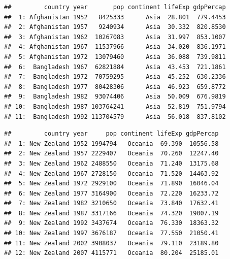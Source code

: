 \documentclass[]{article}
\newenvironment{Shaded}{\begin{snugshade}}{\end{snugshade}}
\newcommand{\KeywordTok}[1]{\textcolor[rgb]{0.13,0.29,0.53}{\textbf{{#1}}}}
\newcommand{\StringTok}[1]{\textcolor[rgb]{0.31,0.60,0.02}{{#1}}}
\newcommand{\CommentTok}[1]{\textcolor[rgb]{0.56,0.35,0.01}{\textit{{#1}}}}
\newcommand{\NormalTok}[1]{{#1}}
\begin{document}
\begin{verbatim}
##         country year       pop continent lifeExp gdpPercap
##  1: Afghanistan 1952   8425333      Asia  28.801  779.4453
##  2: Afghanistan 1957   9240934      Asia  30.332  820.8530
##  3: Afghanistan 1962  10267083      Asia  31.997  853.1007
##  4: Afghanistan 1967  11537966      Asia  34.020  836.1971
##  5: Afghanistan 1972  13079460      Asia  36.088  739.9811
##  6:  Bangladesh 1967  62821884      Asia  43.453  721.1861
##  7:  Bangladesh 1972  70759295      Asia  45.252  630.2336
##  8:  Bangladesh 1977  80428306      Asia  46.923  659.8772
##  9:  Bangladesh 1982  93074406      Asia  50.009  676.9819
## 10:  Bangladesh 1987 103764241      Asia  52.819  751.9794
## 11:  Bangladesh 1992 113704579      Asia  56.018  837.8102
\end{verbatim}

\begin{Shaded}
\end{Shaded}

\begin{verbatim}
##         country year     pop continent lifeExp gdpPercap
##  1: New Zealand 1952 1994794   Oceania  69.390  10556.58
##  2: New Zealand 1957 2229407   Oceania  70.260  12247.40
##  3: New Zealand 1962 2488550   Oceania  71.240  13175.68
##  4: New Zealand 1967 2728150   Oceania  71.520  14463.92
##  5: New Zealand 1972 2929100   Oceania  71.890  16046.04
##  6: New Zealand 1977 3164900   Oceania  72.220  16233.72
##  7: New Zealand 1982 3210650   Oceania  73.840  17632.41
##  8: New Zealand 1987 3317166   Oceania  74.320  19007.19
##  9: New Zealand 1992 3437674   Oceania  76.330  18363.32
## 10: New Zealand 1997 3676187   Oceania  77.550  21050.41
## 11: New Zealand 2002 3908037   Oceania  79.110  23189.80
## 12: New Zealand 2007 4115771   Oceania  80.204  25185.01
\end{verbatim}

\begin{Shaded}
\end{Shaded}
\end{document}
